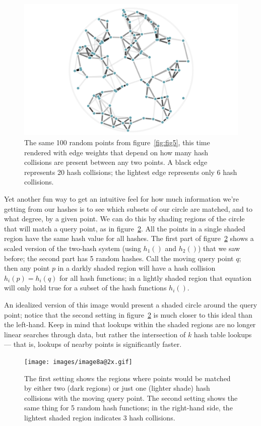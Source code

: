 \documentclass[20pt,]{extarticle}
\begin{document}
\begin{figure}
\centering
\includegraphics{images/lsh_image6.png}
\caption{The same 100 random points from figure~\ref{fig:fig5}, this
time rendered with edge weights that depend on how many hash collisions
are present between any two points. A black edge represents 20 hash
collisions; the lightest edge represents only 6 hash
collisions.}\label{fig:fig6}
\end{figure}

Yet another fun way to get an intuitive feel for how much information
we're getting from our hashes is to see which subsets of our circle are
matched, and to what degree, by a given point. We can do this by shading
regions of the circle that will match a query point, as in
figure~\ref{fig:fig8a}. All the points in a single shaded region have
the same hash value for all hashes. The first part of
figure~\ref{fig:fig8a} shows a scaled version of the two-hash system
(using \(h_1()\) and \(h_2()\)) that we saw before; the second part has
5 random hashes. Call the moving query point \(q;\) then any point \(p\)
in a darkly shaded region will have a hash collision \(h_i(p) = h_i(q)\)
for all hash functions; in a lightly shaded region that equation will
only hold true for a subset of the hash functions \(h_i().\)

An idealized version of this image would present a shaded circle around
the query point; notice that the second setting in
figure~\ref{fig:fig8a} is much closer to this ideal than the left-hand.
Keep in mind that lookups within the shaded regions are no longer linear
searches through data, but rather the intersection of \(k\) hash table
lookups --- that is, lookups of nearby points is significantly faster.

\begin{figure}
\centering
\texttt{[image: images/image8a@2x.gif]}
\caption{The first setting shows the regions where points would be
matched by either two (dark regions) or just one (lighter shade) hash
collisions with the moving query point. The second setting shows the
same thing for 5 random hash functions; in the right-hand side, the
lightest shaded region indicates 3 hash collisions.}\label{fig:fig8a}
\end{figure}
\end{document}
